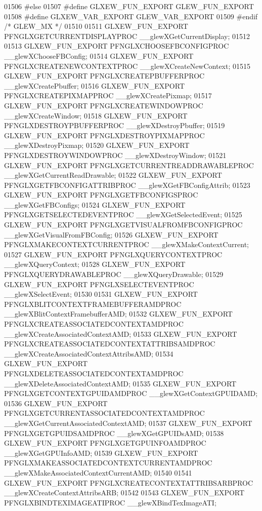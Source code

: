 \begin{DoxyCode}
01506 \textcolor{preprocessor}{#else}
01507 \textcolor{preprocessor}{#define GLXEW\_FUN\_EXPORT GLEW\_FUN\_EXPORT}
01508 \textcolor{preprocessor}{#define GLXEW\_VAR\_EXPORT GLEW\_VAR\_EXPORT}
01509 \textcolor{preprocessor}{#endif }\textcolor{comment}{/* GLEW\_MX */}\textcolor{preprocessor}{}
01510 
01511 GLXEW_FUN_EXPORT PFNGLXGETCURRENTDISPLAYPROC __glewXGetCurrentDisplay;
01512 
01513 GLXEW_FUN_EXPORT PFNGLXCHOOSEFBCONFIGPROC __glewXChooseFBConfig;
01514 GLXEW_FUN_EXPORT PFNGLXCREATENEWCONTEXTPROC __glewXCreateNewContext;
01515 GLXEW_FUN_EXPORT PFNGLXCREATEPBUFFERPROC __glewXCreatePbuffer;
01516 GLXEW_FUN_EXPORT PFNGLXCREATEPIXMAPPROC __glewXCreatePixmap;
01517 GLXEW_FUN_EXPORT PFNGLXCREATEWINDOWPROC __glewXCreateWindow;
01518 GLXEW_FUN_EXPORT PFNGLXDESTROYPBUFFERPROC __glewXDestroyPbuffer;
01519 GLXEW_FUN_EXPORT PFNGLXDESTROYPIXMAPPROC __glewXDestroyPixmap;
01520 GLXEW_FUN_EXPORT PFNGLXDESTROYWINDOWPROC __glewXDestroyWindow;
01521 GLXEW_FUN_EXPORT PFNGLXGETCURRENTREADDRAWABLEPROC __glewXGetCurrentReadDrawable;
01522 GLXEW_FUN_EXPORT PFNGLXGETFBCONFIGATTRIBPROC __glewXGetFBConfigAttrib;
01523 GLXEW_FUN_EXPORT PFNGLXGETFBCONFIGSPROC __glewXGetFBConfigs;
01524 GLXEW_FUN_EXPORT PFNGLXGETSELECTEDEVENTPROC __glewXGetSelectedEvent;
01525 GLXEW_FUN_EXPORT PFNGLXGETVISUALFROMFBCONFIGPROC __glewXGetVisualFromFBConfig;
01526 GLXEW_FUN_EXPORT PFNGLXMAKECONTEXTCURRENTPROC __glewXMakeContextCurrent;
01527 GLXEW_FUN_EXPORT PFNGLXQUERYCONTEXTPROC __glewXQueryContext;
01528 GLXEW_FUN_EXPORT PFNGLXQUERYDRAWABLEPROC __glewXQueryDrawable;
01529 GLXEW_FUN_EXPORT PFNGLXSELECTEVENTPROC __glewXSelectEvent;
01530 
01531 GLXEW_FUN_EXPORT PFNGLXBLITCONTEXTFRAMEBUFFERAMDPROC 
      __glewXBlitContextFramebufferAMD;
01532 GLXEW_FUN_EXPORT PFNGLXCREATEASSOCIATEDCONTEXTAMDPROC 
      __glewXCreateAssociatedContextAMD;
01533 GLXEW_FUN_EXPORT PFNGLXCREATEASSOCIATEDCONTEXTATTRIBSAMDPROC 
      __glewXCreateAssociatedContextAttribsAMD;
01534 GLXEW_FUN_EXPORT PFNGLXDELETEASSOCIATEDCONTEXTAMDPROC 
      __glewXDeleteAssociatedContextAMD;
01535 GLXEW_FUN_EXPORT PFNGLXGETCONTEXTGPUIDAMDPROC __glewXGetContextGPUIDAMD;
01536 GLXEW_FUN_EXPORT PFNGLXGETCURRENTASSOCIATEDCONTEXTAMDPROC 
      __glewXGetCurrentAssociatedContextAMD;
01537 GLXEW_FUN_EXPORT PFNGLXGETGPUIDSAMDPROC __glewXGetGPUIDsAMD;
01538 GLXEW_FUN_EXPORT PFNGLXGETGPUINFOAMDPROC __glewXGetGPUInfoAMD;
01539 GLXEW_FUN_EXPORT PFNGLXMAKEASSOCIATEDCONTEXTCURRENTAMDPROC 
      __glewXMakeAssociatedContextCurrentAMD;
01540 
01541 GLXEW_FUN_EXPORT PFNGLXCREATECONTEXTATTRIBSARBPROC 
      __glewXCreateContextAttribsARB;
01542 
01543 GLXEW_FUN_EXPORT PFNGLXBINDTEXIMAGEATIPROC __glewXBindTexImageATI;

\end{DoxyCode}
